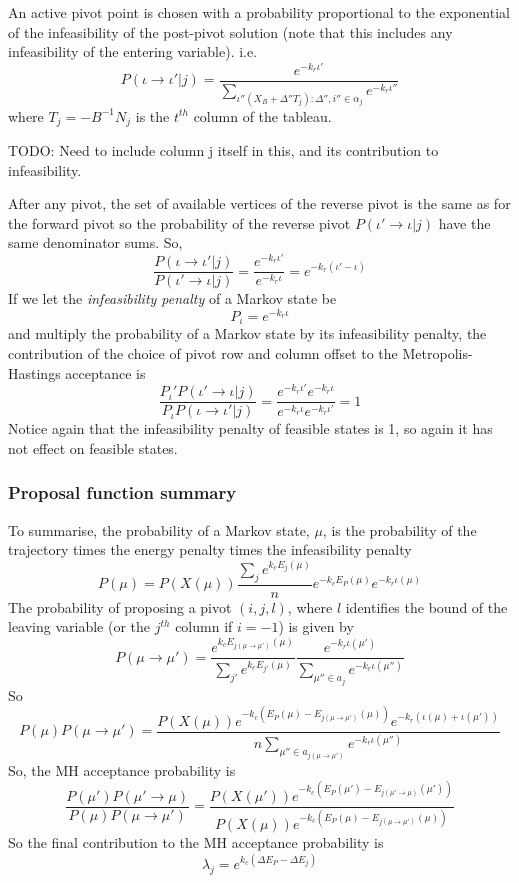 \documentclass{article}
\begin{document}
An active pivot point is chosen with a probability proportional to the exponential of the infeasibility of the post-pivot solution (note that this includes any infeasibility of the entering variable). i.e.
\[
P(\iota \to \iota'|j) = \frac{e^{-k_r\iota'}}{\sum_{\iota''(X_B +\Delta''T_j) : \Delta'',i''\in \alpha_j}  e^{-k_r\iota''}}
\]
where $T_j = -B^{-1}N_j$ is the $t^{th}$ column of the tableau.

TODO: Need to include column j itself in this, and its contribution to infeasibility.

After any pivot, the set of available vertices of the reverse pivot is the same as for the forward pivot so the probability of the reverse pivot $P(\iota' \to \iota|j)$ have the same denominator sums. So,
\[
\frac{P(\iota \to \iota'|j)}{P(\iota' \to \iota|j)} = \frac{e^{-k_r\iota'}}{e^{-k_r\iota}} = e^{-k_r(\iota'-\iota)}
\]
If we let the \textit{infeasibility penalty} of a Markov state be
\[
P_\iota = e^{-k_r\iota}
\]
and multiply the probability of a Markov state by its infeasibility penalty, the contribution of the choice of pivot row and column offset to the Metropolis-Hastings acceptance is
\[
\frac{P_\iota' P(\iota'\to\iota|j)}{P_\iota P(\iota\to\iota'|j)} = \frac{e^{-k_r\iota'}e^{-k_r\iota}}{e^{-k_r\iota}e^{-k_r\iota'}} = 1
\]
Notice again that the infeasibility penalty of feasible states is 1, so again it has not effect on feasible states.

\subsubsection{Proposal function summary}

To summarise, the probability of a Markov state, $\mu$, is the probability of the trajectory times the energy penalty times the infeasibility penalty
\[
P(\mu) = P(X(\mu))\frac{\sum_j e^{k_cE_j(\mu)}}{n} e^{-k_cE_P(\mu)}e^{-k_r\iota(\mu)}
\]
The probability of proposing a pivot $(i,j,l)$, where $l$ identifies the bound of the leaving variable (or the $j^{th}$ column if $i=-1$) is given by
\[
P(\mu \rightarrow \mu') = 
\frac{e^{k_c E_{j(\mu\rightarrow\mu')}(\mu)}}{\sum_{j'} e^{k_c E_{j'}(\mu)}}
\frac{e^{-k_r \iota(\mu')}}{\sum_{\mu'' \in a_j}e^{-k_r\iota(\mu'')}}
\]
So
\[
P(\mu)P(\mu\rightarrow\mu') = 
\frac{P(X(\mu))e^{-k_c(E_P(\mu) - E_{j(\mu\rightarrow\mu')}(\mu))}e^{-k_r(\iota(\mu)+\iota(\mu'))}}
{n\sum_{\mu'' \in a_{j(\mu\rightarrow\mu')}}e^{-k_r\iota(\mu'')}} 
\]
So, the MH acceptance probability is
\[
\frac{P(\mu')P(\mu'\rightarrow \mu)}{P(\mu)P(\mu\rightarrow \mu')} =
\frac{P(X(\mu'))e^{-k_c(E_P(\mu') - E_{j(\mu'\rightarrow\mu)}(\mu'))}}
{P(X(\mu))e^{-k_c(E_P(\mu) - E_{j(\mu\rightarrow\mu')}(\mu))}}
\]
So the final contribution to the MH acceptance probability is 
\[
\lambda_j = e^{k_c(\Delta E_P - \Delta E_j)}
\]
\end{document}
